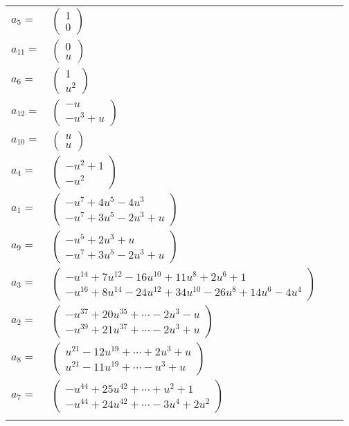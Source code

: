 \documentclass[1p]{elsarticle_modified}
\theoremstyle{definition}
\begin{document}
\begin{tabular}{m{7pt} m{180pt} m{7pt} m{180pt} }
\flushright $a_{5}=$&$\begin{pmatrix}1\\0\end{pmatrix}$ \\
\flushright $a_{11}=$&$\begin{pmatrix}0\\u\end{pmatrix}$ \\
\flushright $a_{6}=$&$\begin{pmatrix}1\\u^2\end{pmatrix}$ \\
\flushright $a_{12}=$&$\begin{pmatrix}- u\\- u^3+u\end{pmatrix}$ \\
\flushright $a_{10}=$&$\begin{pmatrix}u\\u\end{pmatrix}$ \\
\flushright $a_{4}=$&$\begin{pmatrix}- u^2+1\\- u^2\end{pmatrix}$ \\
\flushright $a_{1}=$&$\begin{pmatrix}- u^7+4 u^5-4 u^3\\- u^7+3 u^5-2 u^3+u\end{pmatrix}$ \\
\flushright $a_{9}=$&$\begin{pmatrix}- u^5+2 u^3+u\\- u^7+3 u^5-2 u^3+u\end{pmatrix}$ \\
\flushright $a_{3}=$&$\begin{pmatrix}- u^{14}+7 u^{12}-16 u^{10}+11 u^8+2 u^6+1\\- u^{16}+8 u^{14}-24 u^{12}+34 u^{10}-26 u^8+14 u^6-4 u^4\end{pmatrix}$ \\
\flushright $a_{2}=$&$\begin{pmatrix}- u^{37}+20 u^{35}+\cdots-2 u^3- u\\- u^{39}+21 u^{37}+\cdots-2 u^3+u\end{pmatrix}$ \\
\flushright $a_{8}=$&$\begin{pmatrix}u^{21}-12 u^{19}+\cdots+2 u^3+u\\u^{21}-11 u^{19}+\cdots- u^3+u\end{pmatrix}$ \\
\flushright $a_{7}=$&$\begin{pmatrix}- u^{44}+25 u^{42}+\cdots+u^2+1\\- u^{44}+24 u^{42}+\cdots-3 u^4+2 u^2\end{pmatrix}$\\&\end{tabular}
\end{document}
